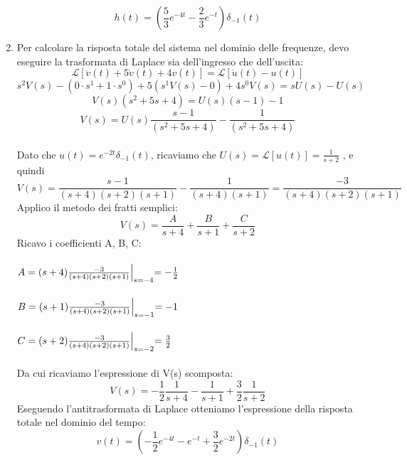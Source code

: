 \documentclass[12pt,a4paper]{article}
\begin{document}
\begin{enumerate}
   	\[
   		h(t) = \left(\frac{5}{3}e^{-4t}-\frac{2}{3}e^{-t}\right) \delta_{-1}(t)
   	\]
	\item Per calcolare la risposta totale del sistema nel dominio delle frequenze, devo eseguire la trasformata di Laplace sia dell'ingresso che dell'uscita:
	\[
		\mathcal{L}[\ddot{v}(t) + 5\dot{v}(t) + 4v(t)] = \mathcal{L}[\dot{u}(t) - u(t)]
	\]
	\vspace{5px}
	\[
		s^2V(s) - (0\cdot s^1+1\cdot s^0) + 5(s^1V(s)-0)+4s^0V(s) = sU(s) - U(s)
	\]
	\vspace{5px}
	\[
		V(s) (s^2 + 5s + 4) = U(s)(s-1) -1
	\]
	\vspace{5px}
	\[
		V(s) = U(s)\frac{s-1}{(s^2+5s+4)}-\frac{1}{(s^2+5s+4)}
	\]
	\vspace{5px}
	\\Dato che $u(t) = e^{-2t} \delta_{-1}(t)$, ricaviamo che $U(s) = \mathcal{L}[u(t)] = \frac{1}{s+2} $ , e quindi
	\[
		V(s) = \frac{s-1}{(s+4)(s+2)(s+1)}-\frac{1}{(s+4)(s+1)} = \frac{-3}{(s+4)(s+2)(s+1)}
	\]
	Applico il metodo dei fratti semplici:
	\[
		V(s) = \frac{A}{s+4}+\frac{B}{s+1}+\frac{C}{s+2}
	\]
	Ricavo i coefficienti A, B, C:\\ \\
	$A = (s+4)\frac{-3}{(s+4)(s+2)(s+1)}\Bigl\vert_{s=-4} = -\frac{1}{2}$\\ \\
	$B = (s+1)\frac{-3}{(s+4)(s+2)(s+1)}\Bigl\vert_{s=-1} = -1$\\ \\
	$C = (s+2)\frac{-3}{(s+4)(s+2)(s+1)}\Bigl\vert_{s=-2} = \frac{3}{2}$\\ \\
	Da cui ricaviamo l'espressione di V(s) scomposta:
	\[
		V(s) = -\frac{1}{2}\frac{1}{s+4}-\frac{1}{s+1}+\frac{3}{2}\frac{1}{s+2}
	\]
	Eseguendo l'antitrasformata di Laplace otteniamo l'espressione della risposta totale nel dominio del tempo:
	\[
		v(t) = \left(-\frac{1}{2}e^{-4t}-e^{-t}+\frac{3}{2}e^{-2t}\right)\delta_{-1}(t)
	\]
	\end{enumerate}
	\newpage
\end{document}
